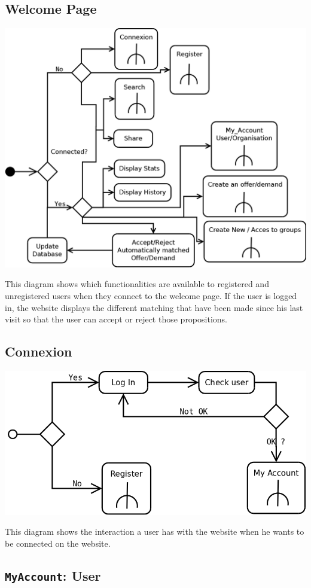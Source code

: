 \subsection{Welcome Page}

\begin{center}
	\includegraphics[width=.75\textwidth]{WelcomePage.png}
\end{center}
This diagram shows which functionalities are available to registered and unregistered users when they
connect to the welcome page. If the user is logged in, the website displays the different matching that have been made since his last visit so that the user can accept or reject those propositions.

\subsection{Connexion}

\begin{center}
	\includegraphics[width=.65\textwidth]{Connexion.png}
\end{center}
This diagram shows the interaction a user has with the website when he wants to be connected on the website.

\subsection{\texttt{MyAccount}: User}

